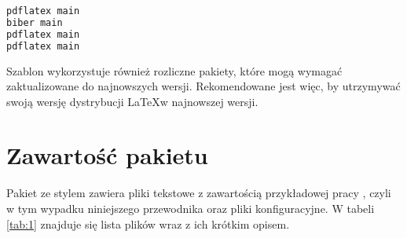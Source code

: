\begin{lstlisting}[language=bash, caption=Skrypt kompilujący, label=alg:1]
pdflatex main
biber main
pdflatex main
pdflatex main

\end{lstlisting}

Szablon wykorzystuje również rozliczne pakiety, które mogą wymagać
zaktualizowane do najnowszych wersji. Rekomendowane jest więc, by utrzymywać swoją wersję dystrybucji \LaTeX w najnowszej wersji.


\section{Zawartość pakietu}

Pakiet ze stylem zawiera pliki tekstowe z zawartością przykładowej pracy , czyli w tym wypadku niniejszego przewodnika oraz pliki konfiguracyjne. W tabeli \ref{tab:1} znajduje się lista plików wraz z ich krótkim opisem.

